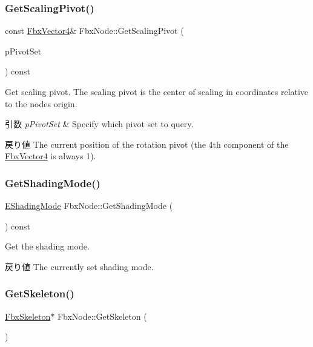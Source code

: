 \subsubsection{\texorpdfstring{Get\+Scaling\+Pivot()}{GetScalingPivot()}}
{\footnotesize\ttfamily const \hyperlink{class_fbx_vector4}{Fbx\+Vector4}\& Fbx\+Node\+::\+Get\+Scaling\+Pivot (\begin{DoxyParamCaption}\item[{\hyperlink{class_fbx_node_ae62b7311ac4727654cdf1ebd5cbf7343}{E\+Pivot\+Set}}]{p\+Pivot\+Set }\end{DoxyParamCaption}) const}

Get scaling pivot. The scaling pivot is the center of scaling in coordinates relative to the node\textquotesingle{}s origin. 
\begin{DoxyParams}{引数}
{\em p\+Pivot\+Set} & Specify which pivot set to query. \\
\hline
\end{DoxyParams}
\begin{DoxyReturn}{戻り値}
The current position of the rotation pivot (the 4th component of the \hyperlink{class_fbx_vector4}{Fbx\+Vector4} is always 1). 
\end{DoxyReturn}
\mbox{\label{class_fbx_node_a5f4b25e0dd49cdf22bf4dcb57843c058}} 
\subsubsection{\texorpdfstring{Get\+Shading\+Mode()}{GetShadingMode()}}
{\footnotesize\ttfamily \hyperlink{class_fbx_node_ab65aa5e41d10dfb4c887667c9a56019d}{E\+Shading\+Mode} Fbx\+Node\+::\+Get\+Shading\+Mode (\begin{DoxyParamCaption}{ }\end{DoxyParamCaption}) const}

Get the shading mode. \begin{DoxyReturn}{戻り値}
The currently set shading mode. 
\end{DoxyReturn}
\mbox{\label{class_fbx_node_a9e676ab9c1b18058e2b968f9374d059b}} 
\subsubsection{\texorpdfstring{Get\+Skeleton()}{GetSkeleton()}}
{\footnotesize\ttfamily \hyperlink{class_fbx_skeleton}{Fbx\+Skeleton}$\ast$ Fbx\+Node\+::\+Get\+Skeleton (\begin{DoxyParamCaption}{ }\end{DoxyParamCaption})}

